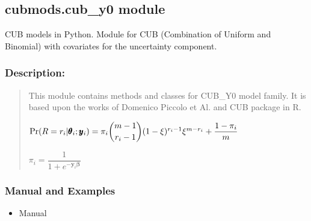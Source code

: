 \documentclass[letterpaper,10pt,english]{sphinxmanual}
\begin{document}
\subsection{cubmods.cub\_y0 module}
\label{\detokenize{cubmods:module-cubmods.cub_y0}}\label{\detokenize{cubmods:cubmods-cub-y0-module}}
\sphinxAtStartPar
CUB models in Python.
Module for CUB (Combination of Uniform
and Binomial) with covariates for the uncertainty component.


\subsubsection{Description:}
\label{\detokenize{cubmods:id80}}\begin{quote}

\sphinxAtStartPar
This module contains methods and classes
for CUB\_Y0 model family.
It is based upon the works of Domenico
Piccolo et Al. and CUB package in R.

\sphinxAtStartPar
\(\Pr(R=r_i|\pmb{\theta}_i ; \pmb y_i) = \pi_i \dbinom{m-1}{r_i-1}(1-\xi)^{r_i-1}\xi^{m-r_i}+\dfrac{1-\pi_i}{m}\)

\sphinxAtStartPar
\(\pi_i = \dfrac{1}{1+e^{-\pmb y_i \pmb\beta}}\)
\end{quote}


\subsubsection{Manual and Examples}
\label{\detokenize{cubmods:id81}}\begin{itemize}
\item {} 
\sphinxAtStartPar
Manual 

\end{itemize}
\end{document}

